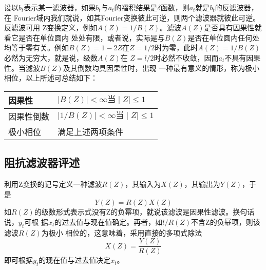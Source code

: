 设以$b_t$表示某一滤波器，如果$b_t$与$a_t$的褶积结果是$\delta$函数，则$a_t$就是$b_t$的反滤波器，在
Fourier域内我们就说，如其Fourier变换彼此可逆，则两个滤波器就彼此可逆。反滤波可用
Z变换定义，例如$A(Z) =1/B(Z)$。滤波$A(Z)$是否具有因果性就看它是否在单位圆内
处处有限，或者说，实际是与$B(Z)$是否在单位圆内任何处均等于零有关。例如$B(Z)=1-2Z$在$Z=1/2$时为零，此时$A(Z)=1/B(Z)$必然为无穷大，就是说，级数$A(Z)$在
$Z=l/2$时必然不收敛，因而$a_t$不具有因果性。当滤波$B(Z)$及其倒数均具因果性时，出现
一种最有意义的情形，称为极小相位，以上所述可总结如下：
\begin{table}[!ht]
\centering
\ttfamily
\small
\begin{tabularx}{\textwidth}{Y|Y}
\hline
因果性& $\mid B(Z)\mid<\infty 当\mid Z\mid \le 1$\\
\hline
因果性倒数& $\mid 1/B(Z)\mid<\infty 当\mid Z\mid \le 1$\\
\hline
极小相位 &满足上述两项条件 \\
\hline
\end{tabularx}
\end{table}

\subsection{阻抗滤波器评述}
\label{sec:4.6.3}

利用Z变换的记号定义一种滤波$R(Z)$，其输入为$X(Z)$，其输出为$Y(Z)$，于是
\begin{equation}
Y(Z)=R(Z)X(Z)
\label{eq:ex4.6.4}
\end{equation}
如$R(Z)$的级数形式表示式没有Z的负幂项，就说该滤波是因果性滤波。换句话说，$y_t$可根
据$x_t$的过去值与现在值确定。再者，如$l/R(Z)$不含Z的负幂项，则该滤波$R(Z)$为极小
相位的，这意味着，采用直接的多项式除法
\begin{equation}
X(Z)=\frac{Y(Z)}{R(Z)}
\label{eq:4.6.5}
\end{equation}
即可根据$y_t$的现在值与过去值决定$x_t$。

